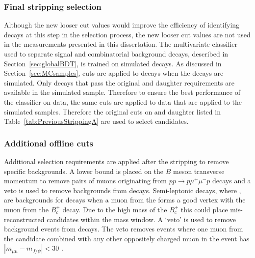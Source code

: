 \subsubsection*{Final stripping selection}
Although the new looser cut values would improve the efficiency of identifying \bmumu decays at this step in the selection process, the new looser cut values are not used in the measurements presented in this dissertation. The multivariate classifier used to separate signal and combinatorial background decays, described in Section~\ref{sec:globalBDT}, is trained on simulated \bbbarmumux decays. As discussed in Section~\ref{sec:MCsamples}, cuts are applied to \bbbarmumux decays when the decays are simulated. Only decays that pass the original \chiFD and daughter \chiIP requirements are available in the simulated sample. Therefore to ensure the best performance of the classifier on data, the same cuts are applied to data that are applied to the simulated samples. Therefore the original cuts on \chiFD and daughter \chiIP listed in Table~\ref{tab:PreviousStrippingA} are used to select \bmumu candidates.





\subsubsection{Additional offline cuts}
\label{finalloosesel}

Additional selection requirements are applied after the stripping to remove specific backgrounds. A lower bound is placed on the $B$ meson transverse momentum to remove pairs of muons originating from $pp \to p\mu^{+}\mu^{-} p$ decays and a \jpsi veto is used to remove backgrounds from \bcjpsimunu decays. Semi-leptonic \bcjpsimunu decays, where \jpsimumu, are backgrounds for \bmumu decays when a muon from the \jpsi forms a good vertex with the muon from the $B_{c}^{+}$ decay. Due to the high mass of the $B_{c}^{+}$ this could place mis-reconstructed candidates within the \bs mass window. A `\jpsi veto' is used to remove background events from \bcjpsimunu decays. The veto removes events where one muon from the \bmumu candidate combined with any other oppositely charged muon in the event has $|m_{\mu\mu} - m_{J/\psi}| < 30$  \mevcc. %


